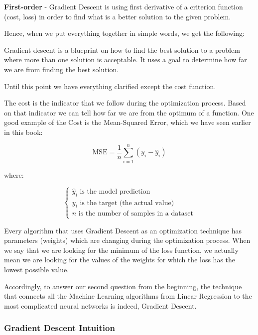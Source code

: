 \documentclass[]{book}
\begin{document}
\textbf{First-order} - Gradient Descent is using first derivative of a criterion function (cost, loss) in order to find what is a better solution to the given problem.

Hence, when we put everything together in simple words, we get the following:

Gradient descent is a blueprint on how to find the best solution to a problem where more than one solution is acceptable. It uses a goal to determine how far we are from finding the best solution.

Until this point we have everything clarified except the cost function.

The cost is the indicator that we follow during the optimization process. Based on that indicator we can tell how far we are from the optimum of a function. One good example of the Cost is the Mean-Squared Error, which we have seen earlier in this book:

\begin{equation*}
    \textrm{MSE} = \frac{1}{n} \sum_{i=1}^n (y_i - \hat{y}_i)
\end{equation*}

where:

\begin{equation*}
    \begin{cases}
        \textrm{$\hat{y}_i$ is the model prediction} \\
        \textrm{$y_i$ is the target (the actual value)} \\
        \textrm{$n$ is the number of samples in a dataset}
    \end{cases}
\end{equation*}

Every algorithm that uses Gradient Descent as an optimization technique has parameters (weights) which are changing during the optimization process. When we say that we are looking for the minimum of the loss function, we actually mean we are looking for the values of the weights for which the loss has the lowest possible value.

Accordingly, to answer our second question from the beginning, the technique that connects all the Machine Learning algorithms from Linear Regression to the most complicated neural networks is indeed, Gradient Descent.

\subsubsection{Gradient Descent Intuition}
\end{document}
